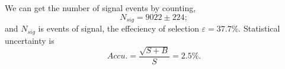 \documentclass[11pt,a4paper]{cepcnote}
\begin{document}
We can get the number of signal events by counting,
\begin{equation*}
N_{sig} = 9022\pm224 ;
\end{equation*}
and $N_{sig}$ is events of signal, the effeciency of selection $\varepsilon = 37.7\%$. Statistical uncertainty is 
\begin{equation*}
Accu.=\frac{\sqrt{S+B}}{S} = 2.5\%.
\end{equation*}

%
\end{document}
